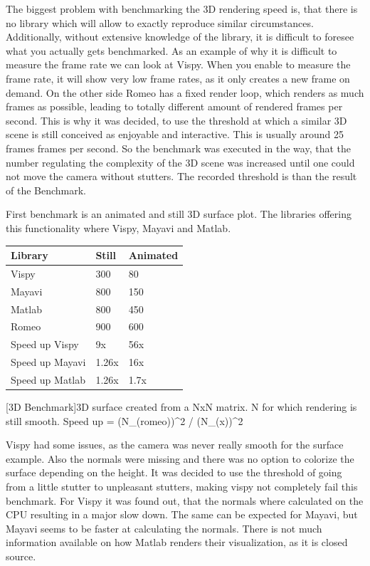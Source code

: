 The biggest problem with benchmarking the 3D rendering speed is, that there is no library which will allow to exactly reproduce similar circumstances. Additionally, without extensive knowledge of the library, it is difficult to foresee what you actually gets benchmarked. 
As an example of why it is difficult to measure the frame rate we can look at Vispy. When you enable to measure the frame rate, it will show very low frame rates, as it only creates a new frame on demand.
On the other  side Romeo has a fixed render loop, which renders as much frames as possible, leading to totally different amount of rendered frames per second. 
This is why it was decided, to use the threshold at which a similar 3D scene is still conceived as enjoyable and interactive. This is usually around 25 frames frames per second.
So the benchmark was executed in the way, that the number regulating the complexity of the 3D scene was increased until one could not move the camera without stutters. The recorded threshold is than the result of the Benchmark.

First benchmark is an animated and still 3D surface plot. The libraries offering this functionality where Vispy, Mayavi and Matlab.

\begin{table}[htbp]
    \centering
    \begin{tabular}{l|l|l}
        \hline
        \textbf{Library} & \textbf{Still} & \textbf{Animated} \\
        \hline
        Vispy            & 300            & 80    \\
        Mayavi           & 800            & 150   \\
        Matlab           & 800            & 450   \\
        Romeo            & 900            & 600   \\
        \hline
        \hline
        Speed up Vispy   & 9x            & 56x   \\
        Speed up Mayavi  & 1.26x         & 16x   \\
        Speed up Matlab  & 1.26x         & 1.7x  \\
    \end{tabular}
    [3D Benchmark]{3D surface created from a NxN matrix. N for which rendering is still smooth. Speed up = (N_(romeo))^2 / (N_(x))^2}
    \label{table:relativespeedoglw}
\end{table}
Vispy had some issues, as the camera was never really smooth for the surface example. Also the normals were missing and there was no option to colorize the surface depending on the height.
It was decided to use the threshold of going from a little stutter to unpleasant stutters, making vispy not completely fail this benchmark.
For Vispy it was found out, that the normals where calculated on the CPU resulting in a major slow down\cite{VispyGithub}. The same can be expected for Mayavi, but Mayavi seems to be faster at calculating the normals.
There is not much information available on how Matlab renders their visualization, as it is closed source.

